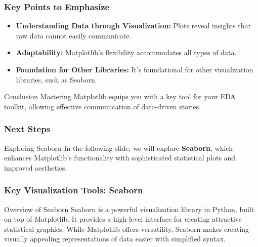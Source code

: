 \documentclass{beamer}
\begin{document}
\begin{frame}
    \frametitle{Key Points to Emphasize}
    \begin{itemize}
        \item \textbf{Understanding Data through Visualization:} Plots reveal insights that raw data cannot easily communicate.
        \item \textbf{Adaptability:} Matplotlib's flexibility accommodates all types of data.
        \item \textbf{Foundation for Other Libraries:} It's foundational for other visualization libraries, such as Seaborn.
    \end{itemize}
    \begin{block}{Conclusion}
        Mastering Matplotlib equips you with a key tool for your EDA toolkit, allowing effective communication of data-driven stories.
    \end{block}
\end{frame}

\begin{frame}
    \frametitle{Next Steps}
    \begin{block}{Exploring Seaborn}
        In the following slide, we will explore \textbf{Seaborn}, which enhances Matplotlib’s functionality with sophisticated statistical plots and improved aesthetics.
    \end{block}
\end{frame}

\begin{frame}[fragile]
    \frametitle{Key Visualization Tools: Seaborn}
    
    \begin{block}{Overview of Seaborn}
        Seaborn is a powerful visualization library in Python, built on top of Matplotlib. It provides a high-level interface for creating attractive statistical graphics. While Matplotlib offers versatility, Seaborn makes creating visually appealing representations of data easier with simplified syntax.
    \end{block}
\end{frame}
\end{document}
